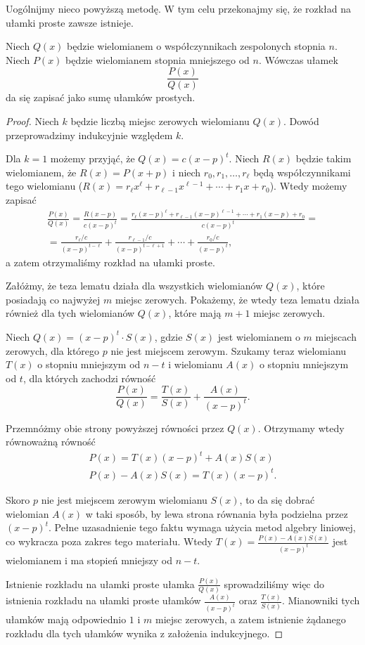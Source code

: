 \documentclass[shortabstract]{imthesis}
\begin{document}
    Uogólnijmy nieco powyższą metodę. W tym celu przekonajmy się, że rozkład na ułamki proste zawsze istnieje.

    \begin{lemma} \label{lemma:partialfracs}
    Niech $Q(x)$ będzie wielomianem o współczynnikach zespolonych stopnia $n$. Niech $P(x)$ będzie wielomianem stopnia mniejszego od $n$. Wówczas ułamek
    $$
    \frac{P(x)}{Q(x)}
    $$
    da się zapisać jako sumę ułamków prostych.
    \end{lemma}
    \begin{proof}
    Niech $k$ będzie liczbą miejsc zerowych wielomianu $Q(x)$. Dowód przeprowadzimy indukcyjnie względem $k$.

    Dla $k = 1$ możemy przyjąć, że $Q(x) = c(x-p)^t$. Niech $R(x)$ będzie takim wielomianem, że $R(x) = P(x+p)$ i niech $r_0, r_1, \ldots, r_\ell$ będą współczynnikami tego wielomianu ($R(x) = r_\ell x^\ell + r_{\ell-1}x^{\ell-1} + \cdots + r_1x + r_0$). Wtedy możemy zapisać
    \begin{gather*}
    \frac{P(x)}{Q(x)} = \frac{R(x-p)}{c(x-p)^t} = \frac{r_\ell (x-p)^\ell + r_{\ell-1}(x-p)^{\ell-1} + \cdots + r_1(x-p) + r_0}{c(x-p)^t} = \\
    = \frac{r_\ell/c}{(x-p)^{t-\ell}} + \frac{r_{\ell-1}/c}{(x-p)^{t-\ell+1}} + \cdots + \frac{r_0/c}{(x-p)^t},
    \end{gather*}
    a zatem otrzymaliśmy rozkład na ułamki proste.

    Załóżmy, że teza lematu działa dla wszystkich wielomianów $Q(x)$, które posiadają co najwyżej $m$ miejsc zerowych. Pokażemy, że wtedy teza lematu działa również dla tych wielomianów $Q(x)$, które mają $m+1$ miejsc zerowych.

    Niech $Q(x) = (x-p)^t \cdot S(x)$, gdzie $S(x)$ jest wielomianem o $m$ miejscach zerowych, dla którego $p$ nie jest miejscem zerowym. Szukamy teraz wielomianu $T(x)$ o stopniu mniejszym od $n-t$ i wielomianu $A(x)$ o stopniu mniejszym od $t$, dla których zachodzi równość
    $$
    \frac{P(x)}{Q(x)} = \frac{T(x)}{S(x)} + \frac{A(x)}{(x-p)^t}.
    $$

    Przemnóżmy obie strony powyższej równości przez $Q(x)$. Otrzymamy wtedy równoważną równość
    \begin{gather*}
    P(x) = T(x) (x-p)^t + A(x) S(x) \\
    P(x) - A(x)S(x) = T(x) (x-p)^t.
    \end{gather*}

    Skoro $p$ nie jest miejscem zerowym wielomianu $S(x)$, to da się dobrać wielomian $A(x)$ w taki sposób, by lewa strona równania była podzielna przez $(x-p)^t$. Pełne uzasadnienie tego faktu wymaga użycia metod algebry liniowej, co wykracza poza zakres tego materiału. Wtedy $T(x) = \frac{P(x)-A(x)S(x)}{(x-p)^t}$ jest wielomianem i ma stopień mniejszy od $n-t$.
    
    Istnienie rozkładu na ułamki proste ułamka $\frac{P(x)}{Q(x)}$ sprowadziliśmy więc do istnienia rozkładu na ułamki proste ułamków $\frac{A(x)}{(x-p)^t}$ oraz $\frac{T(x)}{S(x)}$. Mianowniki tych ułamków mają odpowiednio $1$ i $m$ miejsc zerowych, a zatem istnienie żądanego rozkładu dla tych ułamków wynika z założenia indukcyjnego.
    \end{proof}
\end{document}
